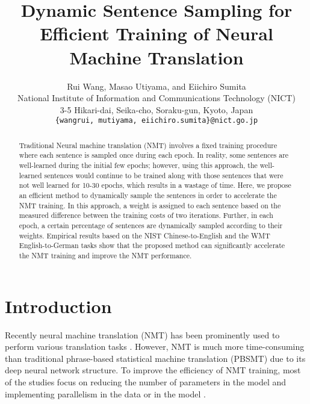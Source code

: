\documentclass[11pt,a4paper]{article}
\title{Dynamic Sentence Sampling for \\ Efficient Training of Neural Machine Translation}
\author{Rui Wang, Masao Utiyama, and Eiichiro Sumita \\
	National Institute of Information and Communications Technology (NICT) \\
	3-5 Hikari-dai, Seika-cho, Soraku-gun, Kyoto, Japan \\
	{\tt \{wangrui, mutiyama, eiichiro.sumita\}@nict.go.jp}}
\date{}
\begin{document}
\maketitle
\begin{abstract}
  Traditional Neural machine translation (NMT)  involves a fixed training procedure where each sentence is sampled once during each epoch. In reality, some sentences are well-learned during the initial few epochs; however, using this approach, the well-learned sentences would continue to be trained along with those sentences that were not well learned for 10-30 epochs, which results in a wastage of time. Here, we propose an efficient method to dynamically sample the sentences in order to accelerate the NMT training. In this approach, a weight is assigned to each sentence based on the measured difference between the training costs of two iterations. Further, in each epoch, a certain percentage of sentences are dynamically sampled according to their weights. Empirical results based on the NIST Chinese-to-English and the WMT English-to-German tasks show that the proposed method can significantly accelerate the NMT training and improve the NMT performance.
\end{abstract}

\section{Introduction}
\label{sec:intr}

Recently neural machine translation (NMT) has been prominently used to perform various translation tasks \citep{luong2015stanford,bojar-EtAl:2017:WMT1}. However, NMT is much more time-consuming than traditional phrase-based statistical machine translation (PBSMT) due to its deep neural network structure. To improve the efficiency of NMT training, most of the studies focus on reducing the number of parameters in the model \citep{DBLP:journals/corr/SeeLM16,DBLP:journals/corr/CregoKKRYSABCDE16,DBLP:journals/corr/HubaraCSEB16} and implementing parallelism in the data or in the model \citep{DBLP:journals/corr/WuSCLNMKCGMKSJL16,DBLP:journals/corr/KalchbrennerESO16,DBLP:journals/corr/GehringAGYD17,DBLP:journals/corr/VaswaniSPUJGKP17}.
\end{document}
